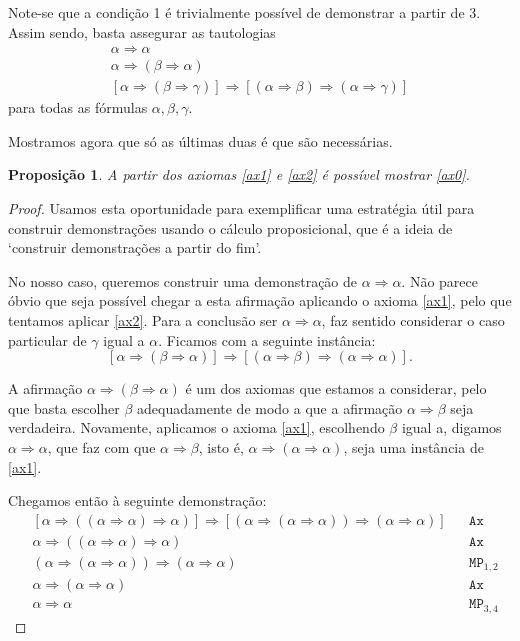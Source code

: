 \documentclass{report}
\newtheorem{prop}{Proposição}
\theoremstyle{definition}
\theoremstyle{remark}
\newcommand{\imply}{\mathbin{\Rightarrow}}
\begin{document}
	Note-se que a condição 1 é trivialmente possível de demonstrar a partir de 3. Assim sendo, basta assegurar as tautologias
	\begin{gather}
	\alpha \imply \alpha\label{ax0}\\
	\alpha \imply (\beta \imply \alpha)\label{ax1}\\
	[\alpha \imply (\beta \imply \gamma)] \imply [(\alpha \imply \beta) \imply (\alpha \imply \gamma)]\label{ax2}
	\end{gather}
	para todas as fórmulas $\alpha, \beta, \gamma$.
	
	Mostramos agora que só as últimas duas é que são necessárias.
	
	\begin{prop}
	A partir dos axiomas \eqref{ax1} e \eqref{ax2} é possível mostrar \eqref{ax0}.
	\end{prop}
	
	\begin{proof}
	Usamos esta oportunidade para exemplificar uma estratégia útil para construir demonstrações usando o cálculo proposicional, que é a ideia de `construir demonstrações a partir do fim'.
	
	No nosso caso, queremos construir uma demonstração de $\alpha \imply \alpha$. Não parece óbvio que seja possível chegar a esta afirmação aplicando o axioma \eqref{ax1}, pelo que tentamos aplicar \eqref{ax2}. Para a conclusão ser $\alpha \imply \alpha$, faz sentido considerar o caso particular de $\gamma$ igual a $\alpha$. Ficamos com a seguinte instância:
	\[[\alpha \imply (\beta \imply \alpha)] \imply [(\alpha \imply \beta) \imply (\alpha \imply \alpha)].\]
	
	A afirmação $\alpha \imply (\beta \imply \alpha)$ é um dos axiomas que estamos a considerar, pelo que basta escolher $\beta$ adequadamente de modo a que a afirmação $\alpha \imply \beta$ seja verdadeira. Novamente, aplicamos o axioma \eqref{ax1}, escolhendo $\beta$ igual a, digamos $\alpha \imply \alpha$, que faz com que $\alpha \imply \beta$, isto é, $\alpha \imply (\alpha \imply \alpha)$, seja uma instância de \eqref{ax1}.
	
	Chegamos então à seguinte demonstração:
	\begin{align*}
	&[\alpha \imply ((\alpha \imply \alpha) \imply \alpha)] \imply [(\alpha \imply (\alpha \imply \alpha)) \imply (\alpha \imply \alpha)]&&\texttt{Ax}\\
	&\alpha \imply ((\alpha \imply \alpha) \imply \alpha)&&\texttt{Ax}\\
	&(\alpha \imply (\alpha \imply \alpha)) \imply (\alpha \imply \alpha)&&\texttt{MP}_{1,2}\\
	&\alpha \imply (\alpha \imply \alpha)&&\texttt{Ax}\\
	&\alpha \imply \alpha&&\texttt{MP}_{3,4}
	\end{align*}
	\end{proof}
	
\end{document}
